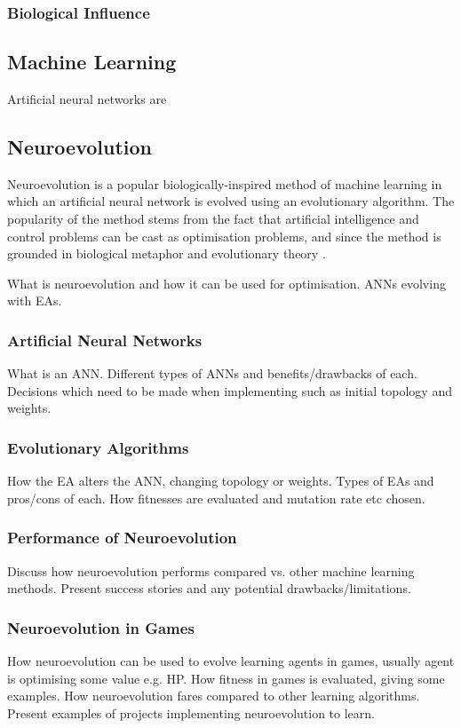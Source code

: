 \documentclass[11pt,a4paper]{article}
\begin{document}
\subsubsection{Biological Influence} 

\subsection{Machine Learning}

Artificial neural networks are 
\subsection{Neuroevolution}
Neuroevolution is a popular biologically-inspired method of machine learning in which an artificial neural network is evolved using an evolutionary algorithm. The popularity of the method stems from the fact that artificial intelligence and control problems can be cast as optimisation problems, and since the method is grounded in biological metaphor and evolutionary theory \cite{risi}.

What is neuroevolution and how it can be used for optimisation. ANNs evolving with EAs.

\subsubsection{Artificial Neural Networks}
What is an ANN. Different types of ANNs and benefits/drawbacks of each. Decisions which need to be made when implementing such as initial topology and weights.


\subsubsection{Evolutionary Algorithms}
How the EA alters the ANN, changing topology or weights. Types of EAs and pros/cons of each. How fitnesses are evaluated and mutation rate etc chosen.

\subsubsection{Performance of Neuroevolution}
Discuss how neuroevolution performs compared vs. other machine learning methods. Present success stories and any potential drawbacks/limitations.

\subsubsection{Neuroevolution in Games}
How neuroevolution can be used to evolve learning agents in games, usually agent is optimising some value e.g. HP. How fitness in games is evaluated, giving some examples. How neuroevolution fares compared to other learning algorithms. Present examples of projects implementing neuroevolution to learn.
\end{document}
